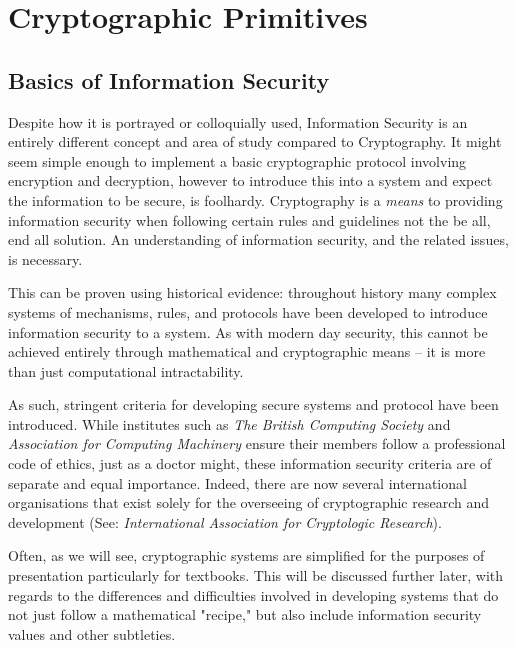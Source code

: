 
\chapter{Cryptographic Primitives} %
\label{Chapter2}

\section{Basics of Information Security}

Despite how it is portrayed or colloquially used, Information Security is an entirely different concept and area of study compared to Cryptography. It might seem simple enough to implement a basic cryptographic protocol involving encryption and decryption, however to introduce this into a system and expect the information to be secure, is foolhardy. Cryptography is a \emph{means} to providing information security when following certain rules and guidelines not the be all, end all solution. An understanding of information security, and the related issues, is necessary. 

This can be proven using historical evidence: throughout history many complex systems of mechanisms, rules, and protocols have been developed to introduce information security to a system. As with modern day security, this cannot be achieved entirely through mathematical and cryptographic means -- it is more than just computational intractability.

As such, stringent criteria for developing secure systems and protocol have been introduced. While institutes such as \emph{The British Computing Society} and \emph{Association for Computing Machinery} ensure their members follow a professional code of ethics, just as a doctor might, these information security criteria are of separate and equal importance. Indeed, there are now several international organisations that exist solely for the overseeing of cryptographic research and development (See: \emph{International Association for Cryptologic Research}).

Often, as we will see, cryptographic systems are simplified for the purposes of presentation particularly for textbooks. This will be discussed further later, with regards to the differences and difficulties involved in developing systems that do not just follow a mathematical "recipe," but also include information security values and other subtleties.

